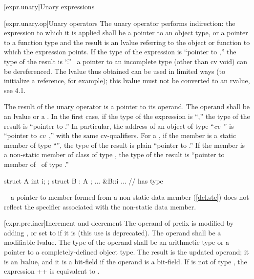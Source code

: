 \documentclass[american]{book}
\begin{document}
[expr.unary]{Unary expressions}

[expr.unary.op]{Unary operators}
\pnum
The unary \mbox{\tcode{*}} operator performs indirection: the expression
to which it is applied shall be a pointer to an 
object type, or a pointer
to a function type and the result is an lvalue referring to the object or
function to which the expression points.  If the type of the expression is
``pointer to \mbox{},'' the type of the result is
``\mbox{}.''
\enternote\
a pointer to an
incomplete type (other than cv void) can be dereferenced. The lvalue thus
obtained can be used in limited ways (to initialize a reference, for
example); this lvalue must not be converted to an rvalue, see 4.1.
\exitnote\

\pnum
{}%
%
The result of the unary
\tcode{\&}
operator is a pointer to its operand.
The operand shall be an lvalue or a
.
In the first case, if the type of the expression is ``,''
the type of the result is ``pointer to
.''
In particular, the address of an object of type ``\textit{cv}\ ''
is ``pointer to \textit{cv}\ \tcode{T},'' with the same cv-qualifiers.
%
For a
,
if the member is a static member of type ``'',
the type of the result is plain ``pointer to
\tcode{T}.''
If the member is a non-static member of class
of type
,
the type of the result is
``pointer to member of \ of type
\tcode{T}.''
\enterexample\ 

\begin{codeblock}
struct A { int i; };
struct B : A { };
... &B::i ...                 // has type 
\end{codeblock}
\exitexample\ 
\enternote\ 
a pointer to member formed from a
non-static data member (\ref{dcl.stc}) does not reflect the
\tcode{mutable}
specifier associated with the non-static data member.
\exitnote\ 

\rSec2 [expr.pre.incr]{Increment and decrement}
\pnum
The operand of prefix \mbox{\tcode{++}} is modified by adding
\mbox{\tcode{1}}, or set to \mbox{\tcode{true}} if it is
\mbox{} (this use is deprecated). The operand shall be a
modifiable lvalue.  The type of the operand shall be an arithmetic type or
a pointer to a completely-defined 
\addedCC{effective}
object type. The result is the updated
operand; it is an lvalue, and it is a bit-field if the operand is a
bit-field. If \mbox{} is not of type \mbox{}, the
expression ++\mbox{\tcode{x}} is equivalent to
\mbox{\tcode{x+=1}}.
\end{document}
